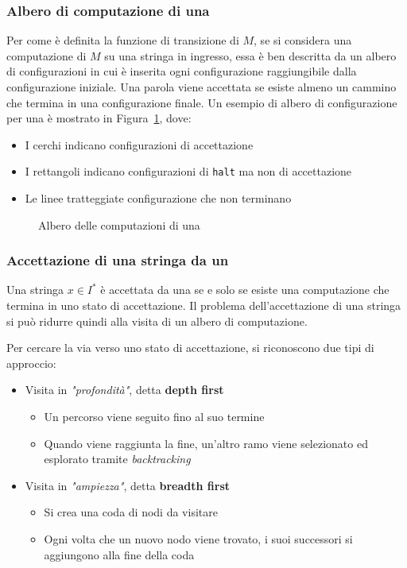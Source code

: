 \documentclass[italian, 10pt]{article}
\begin{document}
\subsubsection{Albero di computazione di una \NTM}

Per come è definita la funzione di transizione di \(M\), se si considera una computazione di \(M\) su una stringa in ingresso, essa è ben descritta da un albero di configurazioni in cui è inserita ogni configurazione raggiungibile dalla configurazione iniziale.
Una parola viene accettata se esiste almeno un cammino che termina in una configurazione finale.
Un esempio di albero di configurazione per una \NTM è mostrato in Figura~\ref{fig:albero-configurazioni-NTM}, dove:

\begin{itemize}
  \item I cerchi indicano configurazioni di accettazione
  \item I rettangoli indicano configurazioni di \texttt{halt} ma non di accettazione
  \item Le linee tratteggiate configurazione che non terminano
\end{itemize}

\begin{figure}[htbp]
  \bigskip
  \centering
  \caption{Albero delle computazioni di una \NTM}
  \label{fig:albero-configurazioni-NTM}
  \bigskip
\end{figure}

\subsubsection{Accettazione di una stringa da un \NTM}

Una stringa \(x \in I^\ast\) è accettata da una \NTM se e solo se esiste una computazione che termina in uno stato di accettazione.
Il problema dell'accettazione di una stringa si pu\`o ridurre quindi alla visita di un albero di computazione.

Per cercare la via verso uno stato di accettazione, si riconoscono due tipi di approccio:

\begin{itemize}
  \item Visita in \textit{"profondità"}, detta \textbf{depth first}
        \begin{itemize}
          \item Un percorso viene seguito fino al suo termine
          \item Quando viene raggiunta la fine, un'altro ramo viene selezionato ed esplorato tramite \textit{backtracking}
        \end{itemize}
  \item Visita in \textit{"ampiezza"}, detta \textbf{breadth first}
        \begin{itemize}
          \item Si crea una coda di nodi da visitare
          \item Ogni volta che un nuovo nodo viene trovato, i suoi successori si aggiungono alla fine della coda
        \end{itemize}
\end{itemize}
\end{document}
